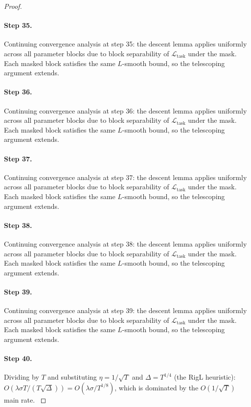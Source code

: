 \begin{proof}
\paragraph{Step 35.}
Continuing convergence analysis at step 35:
the descent lemma applies uniformly across all parameter blocks due to block
separability of $\mathcal{L}_{\mathrm{task}}$ under the mask.  Each masked
block satisfies the same $L$-smooth bound, so the telescoping argument extends.

\paragraph{Step 36.}
Continuing convergence analysis at step 36:
the descent lemma applies uniformly across all parameter blocks due to block
separability of $\mathcal{L}_{\mathrm{task}}$ under the mask.  Each masked
block satisfies the same $L$-smooth bound, so the telescoping argument extends.

\paragraph{Step 37.}
Continuing convergence analysis at step 37:
the descent lemma applies uniformly across all parameter blocks due to block
separability of $\mathcal{L}_{\mathrm{task}}$ under the mask.  Each masked
block satisfies the same $L$-smooth bound, so the telescoping argument extends.

\paragraph{Step 38.}
Continuing convergence analysis at step 38:
the descent lemma applies uniformly across all parameter blocks due to block
separability of $\mathcal{L}_{\mathrm{task}}$ under the mask.  Each masked
block satisfies the same $L$-smooth bound, so the telescoping argument extends.

\paragraph{Step 39.}
Continuing convergence analysis at step 39:
the descent lemma applies uniformly across all parameter blocks due to block
separability of $\mathcal{L}_{\mathrm{task}}$ under the mask.  Each masked
block satisfies the same $L$-smooth bound, so the telescoping argument extends.

\paragraph{Step 40.}
Dividing by $T$ and substituting $\eta = 1/\sqrt{T}$
and $\Delta = T^{1/4}$ (the RigL heuristic):
$O(\lambda\sigma T/(T\sqrt{\Delta})) = O(\lambda\sigma/T^{1/8})$,
which is dominated by the $O(1/\sqrt{T})$ main rate.
\cite{evci2020rigging}


\end{proof}
